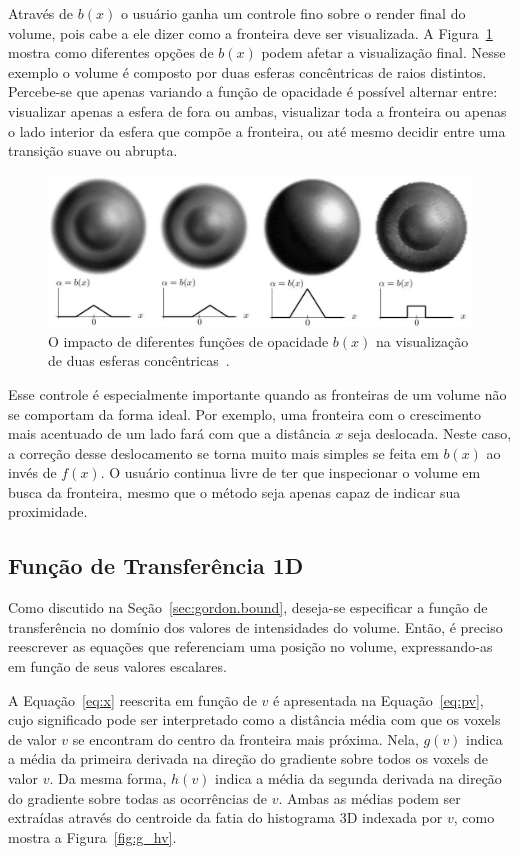 	Através de $b(x)$ o usuário ganha um controle fino sobre o render final do volume, pois cabe a ele dizer como a fronteira deve ser visualizada. A Figura~\ref{fig:g_bx} mostra como diferentes opções de $b(x)$ podem afetar a visualização final. Nesse exemplo o volume é composto por duas esferas concêntricas de raios distintos. Percebe-se que apenas variando a função de opacidade é possível alternar entre: visualizar apenas a esfera de fora ou ambas, visualizar toda a fronteira ou apenas o lado interior da esfera que compõe a fronteira, ou até mesmo decidir entre uma transição suave ou abrupta.
	
\begin{figure}[h]
	\centering
	\includegraphics[width=1\textwidth]{images/g_bx}
	\caption{O impacto de diferentes funções de opacidade $b(x)$ na visualização de duas esferas concêntricas~\cite{gordon}.}
	\label{fig:g_bx}
\end{figure}

	Esse controle é especialmente importante quando as fronteiras de um volume não se comportam da forma ideal. Por exemplo, uma fronteira com o crescimento mais acentuado de um lado fará com que a distância $x$ seja deslocada. Neste caso, a correção desse deslocamento se torna muito mais simples se feita em $b(x)$ ao invés de $f(x)$. O usuário continua livre de ter que inspecionar o volume em busca da fronteira, mesmo que o método seja apenas capaz de indicar sua proximidade.
	
\subsection{Função de Transferência 1D}
\label{subsec:gordon.1d}
	Como discutido na Seção~\ref{sec:gordon.bound}, deseja-se especificar a função de transferência no domínio dos valores de intensidades do volume. Então, é preciso reescrever as equações que referenciam uma posição no volume, expressando-as em função de seus valores escalares.
	
	A Equação~\eqref{eq:x} reescrita em função de $v$ é apresentada na Equação~\eqref{eq:pv}, cujo significado pode ser interpretado como a distância média com que os voxels de valor $v$ se encontram do centro da fronteira mais próxima. Nela, $g(v)$ indica a média da primeira derivada na direção do gradiente sobre todos os voxels de valor $v$. Da mesma forma, $h(v)$ indica a média da segunda derivada na direção do gradiente sobre todas as ocorrências de $v$. Ambas as médias podem ser extraídas através do centroide da fatia do histograma 3D indexada por $ v $, como mostra a Figura~\ref{fig:g_hv}.
	
